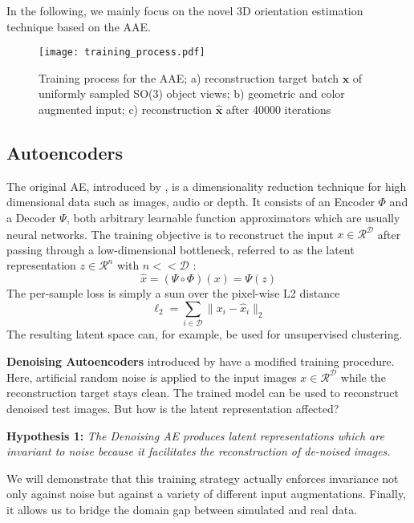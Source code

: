 In the following, we mainly focus on the novel 3D orientation estimation technique based on the AAE.
\begin{figure*}[t]\centering
	\captionsetup{width=0.9\textwidth}
	\texttt{[image: training\_process.pdf]}
	\caption{Training process for the \gls{AAE}; a) reconstruction target batch $\pmb x$ of uniformly sampled SO(3) object views; b) geometric and color augmented input; c) reconstruction $\pmb{\hat{x}}$ after 40000 iterations}
	\label{fig:training_process}
\end{figure*}
\subsection{Autoencoders}

The original \gls{AE}, introduced by \cite{rumelhart1985learning}, is a dimensionality reduction technique for high dimensional data such as images, audio or depth. It consists of an Encoder $\Phi$ and a Decoder $\Psi$, both arbitrary learnable function approximators which are usually neural networks. The training objective is to reconstruct the input $x \in \mathcal{R}^{\mathcal{D}}$ after passing through a low-dimensional bottleneck, referred to as the latent representation $z \in \mathcal{R}^{n}$ with $n << \mathcal{D}$ :
\begin{equation}
\label{eq:yhat}
\hat{x} = (\Psi\circ\Phi)(x) = \Psi(z)
\end{equation}
The per-sample loss is simply a sum over the pixel-wise L2 distance
\begin{equation}
\label{eq:ae_loss}
\ell_{2} = \sum_{i \in \mathcal{D}} \parallel x_{i}-\hat{x}_{i}\parallel_2
\end{equation}
The resulting latent space can, for example, be used for unsupervised clustering.

\textbf{Denoising Autoencoders} introduced by \cite{vincent2010stacked} have a modified training procedure. Here, artificial random noise is applied to the input images $x \in \mathcal{R}^{\mathcal{D}}$ while the reconstruction target stays clean. The trained model can be used to reconstruct denoised test images. But how is the latent representation affected? 

\textbf{Hypothesis 1:} \textit{The Denoising AE produces latent representations which are invariant to noise because it facilitates the reconstruction of de-noised images.}

We will demonstrate that this training strategy actually enforces invariance not only against noise but against a variety of different input augmentations. Finally, it allows us to bridge the domain gap between simulated and real data.

